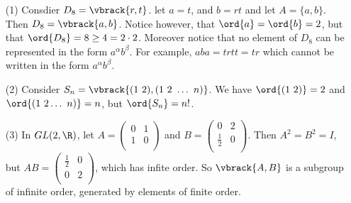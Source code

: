 \begin{example}\label{2.10}
    \begin{enumerate}
        \item[(1)] Consdier $D_8=\vbrack{r,t}$. let $a=t$, and  $b=rt$ and let
            $A=\{a,b\}$. Then $D_8=\vbrack{a,b}$. Notice however, that
            $\ord{a}=\ord{b}=2$, but that $\ord{D_8}=8 \geq 4 = 2 \cdot 2$.
            Moreover notice that no element of $D_8$ can be represented in the
            form $a^\alpha b^\beta$. For example,  $aba=trtt=tr$ which cannot be
            written in the form $a^\alpha b^\beta$.

        \item[(2)] Consider $S_n=\vbrack{(1 \ 2), (1 \ 2 \ \dots \ n)}$. We have
            $\ord{(1 \ 2)}=2$ and $\ord{(1 \ 2 \dots \ n)}=n$, but
            $\ord{S_n}=n!$.

        \item[(3)] In $GL(2,\R)$, let $A=\begin{pmatrix}0 & 1 \\ 1 & 0
            \\\end{pmatrix}$ and $B=\begin{pmatrix}0 & 2 \\ \frac{1}{2} & 0
            \\\end{pmatrix}$. Then $A^2=B^2=I$, but
                $AB=\begin{pmatrix} \frac{1}{2} & 0 \\ 0 & 2 \\\end{pmatrix}$,
                which has infite order. So $\vbrack{A,B}$ is a subgroup of
                infinite order, generated by elements of finite order.
    \end{enumerate}
\end{example}
